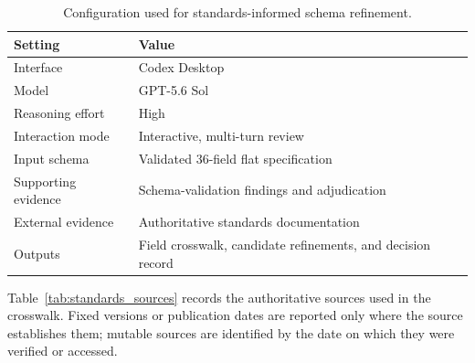 \documentclass{article}
\begin{document}
\begin{table}[!ht]
    \centering
    \caption{Configuration used for standards-informed schema refinement.}
    \label{tab:standards_refinement_configuration}
    \begin{tabular}{ll}
        \toprule
        \textbf{Setting} & \textbf{Value} \\
        \midrule
        Interface & Codex Desktop \\
        Model & GPT-5.6 Sol \\
        Reasoning effort & High \\
        Interaction mode & Interactive, multi-turn review \\
        Input schema & Validated 36-field flat specification \\
        Supporting evidence & Schema-validation findings and adjudication \\
        External evidence & Authoritative standards documentation \\
        Outputs & Field crosswalk, candidate refinements, and decision record \\
        \bottomrule
    \end{tabular}
\end{table}

Table~\ref{tab:standards_sources} records the authoritative sources used in the crosswalk. Fixed versions or publication dates are reported only where the source establishes them; mutable sources are identified by the date on which they were verified or accessed.
\end{document}
